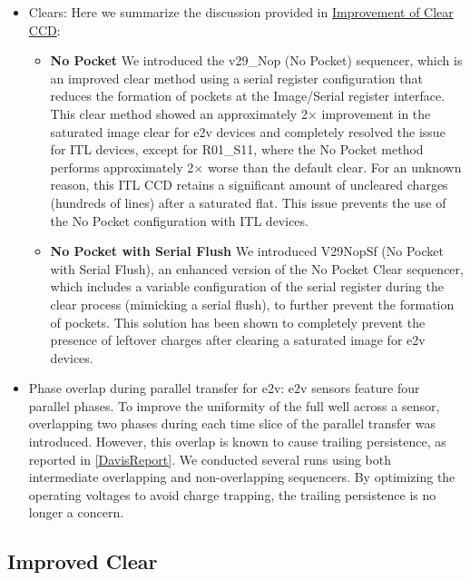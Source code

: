 \begin{itemize}
\item Clears:  Here we summarize the discussion provided in
  \href{https://sitcomtn-148.lsst.io/#serialRemnants}{Improvement of
  Clear CCD}:

  \begin{itemize}
  \item
    \textbf{No Pocket}
  We introduced the v29\_Nop (No Pocket)
  sequencer, which is an improved clear method using a serial register
  configuration that reduces the formation of pockets at the Image/Serial
  register interface. This clear method showed an approximately 2$\times$
  improvement in the saturated image clear for e2v devices and completely
  resolved the issue for ITL devices, except for R01\_S11,
  where the No Pocket method performs approximately 2$\times$ worse than the default clear. 
  For an unknown reason, this ITL CCD retains a significant amount of uncleared charges 
  (hundreds of lines) after a saturated flat. This issue prevents the use of the No
  Pocket configuration with ITL devices.

  \item
    \textbf{No Pocket with Serial Flush}
  We introduced V29NopSf (No Pocket with Serial Flush), an enhanced version of the No Pocket Clear
  sequencer, which includes a variable configuration of the serial register
  during the clear process (mimicking a serial flush), to further prevent the
  formation of pockets. This solution has been shown to completely prevent the presence of leftover charges after clearing a saturated image for e2v devices.
  \end{itemize}
  

\item Phase overlap during parallel transfer for e2v: e2v sensors feature four parallel phases. To improve the uniformity of the full well across a sensor, overlapping two phases during each time slice of the parallel transfer was introduced. However, this overlap is known to cause trailing persistence, as reported in \ref{DavisReport}. We conducted several runs using both intermediate overlapping and non-overlapping sequencers. By optimizing the operating voltages to avoid charge trapping, the trailing persistence is no longer a concern.
\end{itemize}

\subsection{Improved Clear}\label{improved-clear}

